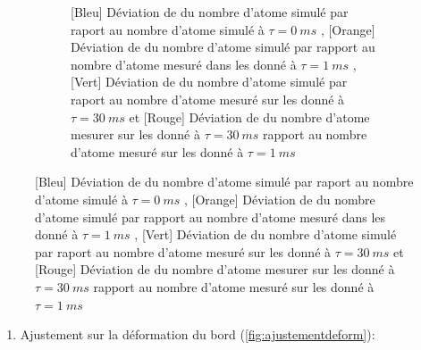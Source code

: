 \documentclass[a3, 10pt,twoside]{article}          %
\theoremstyle{plain}
\theoremstyle{definition}
\theoremstyle{remark}
\theoremstyle{definition} %
\def\OliveGreen{OliveGreen}
\begin{document}
\begin{figure}[!ht]
\begin{subfigure}[b]{0.45\textwidth}
        		\caption{{\color{blue}[Bleu] Déviation de du nombre d'atome simulé par raport au nombre d'atome simulé à $\tau = 0 ~ms$ } , {\color{orange}[Orange] Déviation de du nombre d'atome simulé par rapport au nombre d'atome mesuré dans les donné à $\tau = 1 ~ms$} ,  {\color{\OliveGreen}[Vert] Déviation de du nombre d'atome simulé par raport au nombre d'atome mesuré sur les donné à $\tau = 30 ~ms$} et {\color{red}[Rouge] Déviation de du nombre d'atome mesurer sur les donné à $\tau = 30 ~ms$ rapport au nombre d'atome mesuré sur les donné à $\tau = 1 ~ms$} }
        		\label{fig:nat}
    		\end{subfigure}
				
		\end{figure}
		
			\begin{enumerate}[label =\Alph*)]
				
				\item Ajustement sur la déformation du bord (\ref{fig:ajustementdeform}):


\end{enumerate}
\end{document}
